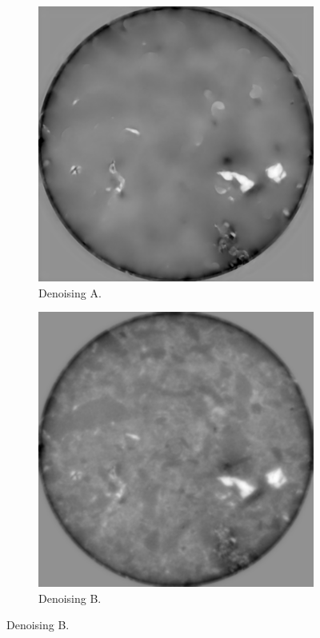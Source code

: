 \begin{figure}
  \begin{subfigure}[t]{.45\textwidth}
    \centering
    \includegraphics[width=\linewidth]{figures/shale/shale_dn_tomo00058/0.png}
    \caption{Denoising A. }
  \end{subfigure}
  \hfill
  \begin{subfigure}[t]{.45\textwidth}
    \centering
    \includegraphics[width=\linewidth]{figures/shale/shale_dn_tomo00001/0.png}
    \caption{Denoising B. }
  \end{subfigure}


\end{figure}
